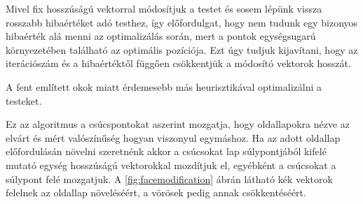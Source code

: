 Mivel fix hosszúságú vektorral módosítjuk a testet és sosem lépünk vissza rosszabb hibaértéket adó testhez, így előfordulgat, hogy nem tudunk egy bizonyos hibaérték alá menni az optimalizálás során, mert a pontok egységsugarú környezetében található az optimális pozíciója.
Ezt úgy tudjuk kijavítani, hogy az iterációszám és a hibaértéktől függően csökkentjük a módosító vektorok hosszát.

A fent említett okok miatt érdemesebb más heurisztikával optimalizálni a testeket.

\label{sect:facemodification}

Ez az algoritmus a csúcspontokat aszerint mozgatja, hogy oldallapokra nézve az elvárt és mért valószínűség hogyan viszonyul egymáshoz.
Ha az adott oldallap előfordulásán növelni szeretnénk akkor a csúcsokat lap súlypontjából kifelé mutató egység hosszúságú vektorokkal mozdítjuk el, egyébként a csúcsokat a súlypont felé mozgatjuk.
A \ref{fig:facemodification} ábrán látható kék vektorok felelnek az oldallap növeléséért, a vörösek pedig annak csökkentéséért.


